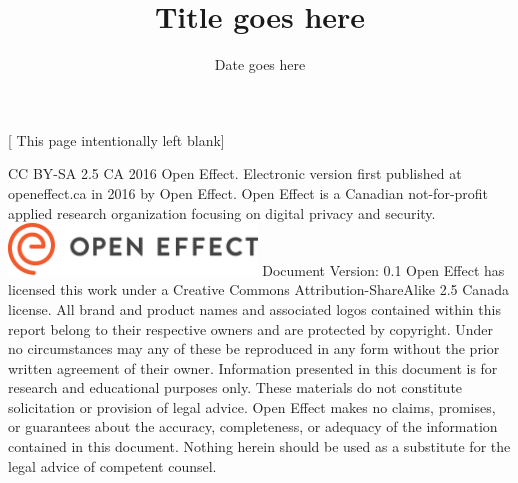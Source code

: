 \documentclass[12pt]{article}
\title{Title goes here}
\date{Date goes here}
\begin{document}
\maketitle
\pagebreak
\hfill
\vspace{86pt}
\begin{center}
[ This page intentionally left blank]
\end{center}
\pagebreak


\begin{spacing}{1}
\noindent
CC BY-SA 2.5 CA 2016 Open Effect.
\hfill \break
\hfill \break
Electronic version first published at openeffect.ca in 2016 by Open Effect. Open Effect is a Canadian not-for-profit applied research organization focusing on digital privacy and security. 
\hfill \break
\hfill \break
\hfill \break
\hfill \break
\includegraphics[width=2.6in]{oe-assets/OE-Logo-CMYK.eps}
\hfill {}
\hfill \break
\hfill \break
Document Version: 0.1
\hfill \break
\hfill \break
Open Effect has licensed this work under a Creative Commons Attribution-ShareAlike 2.5 Canada license. All brand and product names and associated logos contained within this report belong to their respective owners and are protected by copyright. Under no circumstances may any of these be reproduced in any form without the prior written agreement of their owner.
\hfill \break
\hfill \break
Information presented in this document is for research and educational purposes only. These materials do not constitute solicitation or provision of legal advice. Open Effect makes no claims, promises, or guarantees about the accuracy, completeness, or adequacy of the information contained in this document. Nothing herein should be used as a substitute for the legal advice of competent counsel.
\hfill \break
\hfill \break
\hfill \break\hfill \break



\end{spacing}
\end{document}
